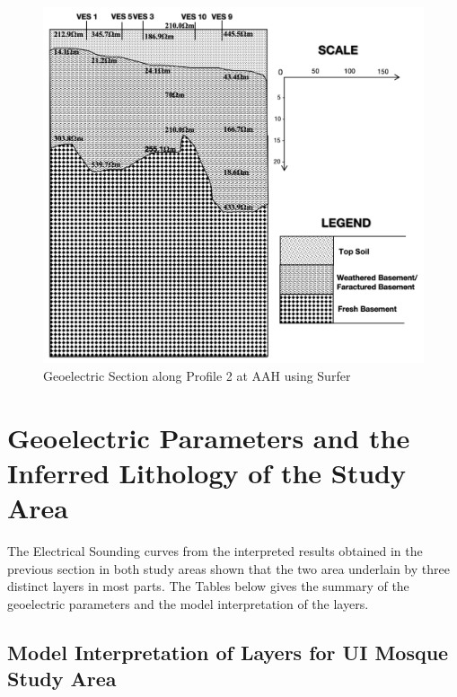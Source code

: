 \documentclass[12pt,a4paper]{report}
\begin{document}
\begin{figure}[H]
    \centering
    \includegraphics[width=1.0\textwidth]{AAH_PROFILE_2.png}
    \caption{Geoelectric Section along Profile 2 at AAH using Surfer}
    \label{fig:AAH_Surfer_Profile_2}
\end{figure}

\section{Geoelectric Parameters and the Inferred Lithology of the Study Area}
The Electrical Sounding curves from the interpreted results obtained in the previous section in both study areas shown that the two area underlain by three distinct layers in most parts. The Tables below gives the summary of the geoelectric parameters and the model interpretation of the layers. 

\subsection{Model Interpretation of Layers for UI Mosque Study Area}
\end{document}
